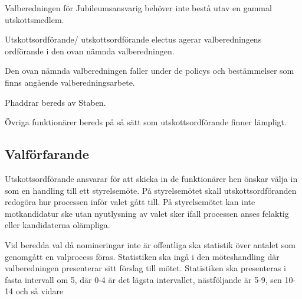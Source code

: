 \documentclass{dsekprotokoll}
\begin{document}
Valberedningen för Jubileumsansvarig behöver inte bestå utav en gammal utskottsmedlem.

Utskottsordförande/ utskottsordförande electus agerar valberedningens ordförande i den ovan nämnda valberedningen.

Den ovan nämnda valberedningen faller under de policys och bestämmelser som finns angående valberedningsarbete.

Phaddrar bereds av Staben.

Övriga funktionärer bereds på så sätt som utskottsordförande finner lämpligt.

\subsection{Valförfarande}
Utskottsordförande ansvarar för att skicka in de funktionärer hen önskar välja in som en handling till ett styrelsemöte. På styrelsemötet skall utskottsordföranden redogöra hur processen inför valet gått till. På styrelsemötet kan inte motkandidatur ske utan nyutlysning av valet sker ifall processen anses felaktig eller kandidaterna olämpliga.

Vid beredda val då nomineringar inte är offentliga ska statistik över antalet som genomgått en valprocess föras. Statistiken ska ingå i den möteshandling där valberedningen presenterar sitt förslag till mötet. Statistiken ska presenteras i fasta intervall om 5, där 0-4
är det lägsta intervallet, nästföljande är 5-9, sen 10-14 och så
vidare

\pagebreak
\end{document}
